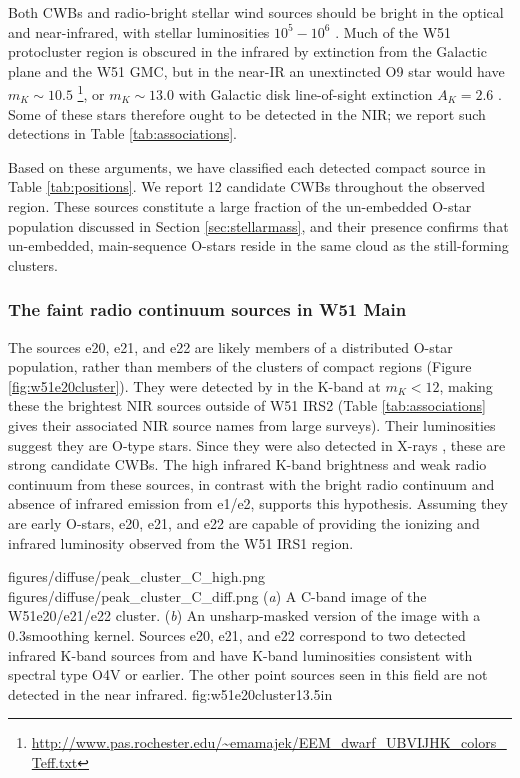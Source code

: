 Both CWBs and radio-bright stellar wind sources should be bright in the
optical and near-infrared, with stellar luminosities $10^5-10^6$ \lsun.
Much of the W51 protocluster region is obscured in the infrared by extinction
from the Galactic plane and the W51 GMC, but in the near-IR an unextincted O9
star would have
$m_K\sim10.5$
\citep{Pecaut2013a}\footnote{\url{http://www.pas.rochester.edu/~emamajek/EEM_dwarf_UBVIJHK_colors_Teff.txt}},
or $m_K\sim 13.0$ with Galactic disk line-of-sight extinction $A_K=2.6$
\citep{Goldader1994a}.  Some of these stars therefore ought to be detected in
the NIR; we report such detections in Table \ref{tab:associations}.

Based on these arguments, we have classified each detected compact source in
Table \ref{tab:positions}.  We report 12 candidate CWBs throughout the observed
region.  These sources constitute a large fraction of the un-embedded O-star
population discussed in Section \ref{sec:stellarmass}, and their presence confirms
that un-embedded, main-sequence O-stars reside in the same cloud as the still-forming
clusters.

\subsubsection{The faint radio continuum sources in W51 Main}
\label{sec:faintw51main}

The sources e20, e21, and e22 are likely members of a distributed O-star
population, rather than members of the clusters of compact \hii regions (Figure
\ref{fig:w51e20cluster}).  They were detected by \citet{Goldader1994a} in the
K-band at $m_K < 12$, making these the brightest NIR sources outside of W51
IRS2 (Table \ref{tab:associations} gives their associated NIR source names
from large surveys).  Their luminosities suggest they are O-type stars.  Since
they were also detected in X-rays \citep{Townsley2014a}, these are strong
candidate CWBs.  The high infrared K-band brightness and weak radio
continuum from these sources, in contrast with the bright radio continuum and
absence of infrared emission from e1/e2, supports this hypothesis.  
Assuming they are early O-stars, e20, e21, and e22 are capable of providing the
ionizing and infrared luminosity observed from the W51 IRS1 \hii region.

\FigureTwo
{figures/diffuse/peak_cluster_C_high.png}
{figures/diffuse/peak_cluster_C_diff.png}
{({\it a}) A C-band image of the W51e20/e21/e22 cluster.
({\it b}) An unsharp-masked version of the image with a 0.3\arcsec smoothing
kernel. 
Sources e20, e21, and e22 correspond to two detected infrared K-band sources from
\citet[][Table \ref{tab:associations}]{Goldader1994a} and have K-band
luminosities consistent with spectral type O4V or earlier.  The other point
sources seen in this field are not detected in the near infrared.
}
{fig:w51e20cluster}{1}{3.5in}


